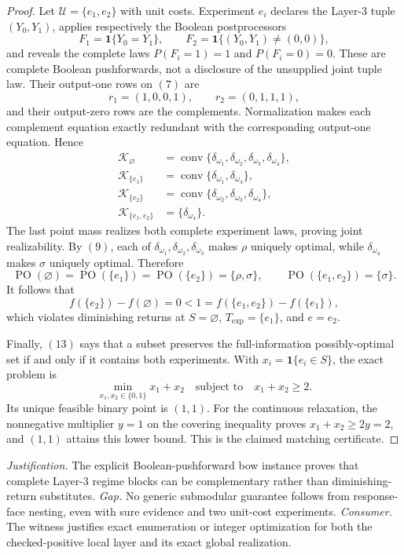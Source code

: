 \documentclass{article}
\begin{document}
\begin{proof}
Let \(\mathcal U=\{e_1,e_2\}\) with unit costs.  Experiment \(e_i\) declares the
Layer-3 tuple \((Y_0,Y_1)\), applies respectively the Boolean postprocessors
\[
F_1=\mathbf1\{Y_0=Y_1\},
\qquad
F_2=\mathbf1\{(Y_0,Y_1)\ne(0,0)\},
\tag{10}
\]
and reveals the complete laws \(P(F_i=1)=1\) and \(P(F_i=0)=0\).  These are
complete Boolean pushforwards, not a disclosure of the unsupplied joint tuple law.
Their output-one rows on \((7)\) are
\[
r_1=(1,0,0,1),
\qquad
r_2=(0,1,1,1),
\tag{11}
\]
and their output-zero rows are the complements.  Normalization makes each complement
equation exactly redundant with the corresponding output-one equation.  Hence
\[
\begin{aligned}
\mathcal K_{\varnothing}
 &=\operatorname{conv}\{\delta_{\omega_1},\delta_{\omega_2},
     \delta_{\omega_3},\delta_{\omega_4}\},\\
\mathcal K_{\{e_1\}}
 &=\operatorname{conv}\{\delta_{\omega_1},\delta_{\omega_4}\},\\
\mathcal K_{\{e_2\}}
 &=\operatorname{conv}\{\delta_{\omega_2},\delta_{\omega_3},
     \delta_{\omega_4}\},\\
\mathcal K_{\{e_1,e_2\}}
 &=\{\delta_{\omega_4}\}.
\end{aligned}
\tag{12}
\]
The last point mass realizes both complete experiment laws, proving joint
realizability.  By \((9)\), each of
\(\delta_{\omega_1},\delta_{\omega_2},\delta_{\omega_3}\) makes \(\rho\) uniquely
optimal, while \(\delta_{\omega_4}\) makes \(\sigma\) uniquely optimal.  Therefore
\[
\operatorname{PO}(\varnothing)=
\operatorname{PO}(\{e_1\})=
\operatorname{PO}(\{e_2\})=\{\rho,\sigma\},
\qquad
\operatorname{PO}(\{e_1,e_2\})=\{\sigma\}.
\tag{13}
\]
It follows that
\[
f(\{e_2\})-f(\varnothing)=0
<1=f(\{e_1,e_2\})-f(\{e_1\}),
\tag{14}
\]
which violates diminishing returns at \(S=\varnothing\),
\(T_{\mathrm{exp}}=\{e_1\}\), and \(e=e_2\).

Finally, \((13)\) says that a subset preserves the full-information possibly-optimal
set if and only if it contains both experiments.  With
\(x_i=\mathbf1\{e_i\in S\}\), the exact problem is
\[
\min_{x_1,x_2\in\{0,1\}}x_1+x_2
\quad\text{subject to}\quad x_1+x_2\geq2.
\tag{15}
\]
Its unique feasible binary point is \((1,1)\).  For the continuous relaxation, the
nonnegative multiplier \(y=1\) on the covering inequality proves
\(x_1+x_2\geq2y=2\), and \((1,1)\) attains this lower bound.  This is the claimed
matching certificate.
\end{proof}
\par\smallskip\noindent \textit{Justification.} The explicit Boolean-pushforward bow instance proves that complete Layer-3 regime blocks can be complementary rather than diminishing-return substitutes. \textit{Gap.} No generic submodular guarantee follows from response-face nesting, even with sure evidence and two unit-cost experiments. \textit{Consumer.} The witness justifies exact enumeration or integer optimization for both the checked-positive local layer and its exact global realization.
\end{document}
